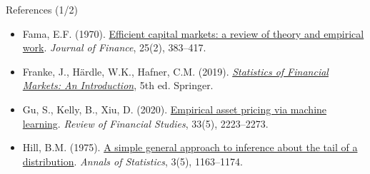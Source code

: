 \begin{frame}{References (1/2)}
\begin{itemize}
    \item Fama, E.F. (1970). \href{https://doi.org/10.2307/2325486}{Efficient capital markets: a review of theory and empirical work}. \textit{Journal of Finance}, 25(2), 383--417.
    \item Franke, J., Härdle, W.K., Hafner, C.M. (2019). \href{https://doi.org/10.1007/978-3-030-13751-9}{\textit{Statistics of Financial Markets: An Introduction}}, 5th ed. Springer.
    \item Gu, S., Kelly, B., Xiu, D. (2020). \href{https://doi.org/10.1093/rfs/hhaa009}{Empirical asset pricing via machine learning}. \textit{Review of Financial Studies}, 33(5), 2223--2273.
    \item Hill, B.M. (1975). \href{https://doi.org/10.1214/aos/1176343247}{A simple general approach to inference about the tail of a distribution}. \textit{Annals of Statistics}, 3(5), 1163--1174.
\end{itemize}
\end{frame}

